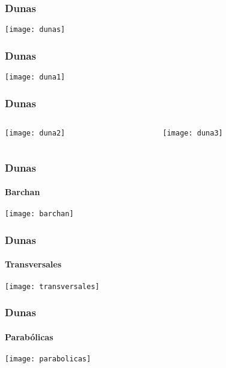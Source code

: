 \documentclass{beamer}
\begin{document}
\begin{frame}
\frametitle{Dunas}
\begin{center}
\texttt{[image: dunas]}
\end{center}
\end{frame}
\begin{frame}
\frametitle{Dunas}
\begin{center}
\texttt{[image: duna1]}
\end{center}
\end{frame}
\begin{frame}
\frametitle{Dunas}
\begin{columns}
\begin{column}{0.5\linewidth}
\begin{center}
\texttt{[image: duna2]}
\end{center}
\end{column}
\begin{column}{0.5\linewidth}
\begin{center}
\texttt{[image: duna3]}
\end{center}
\end{column}
\end{columns}
\end{frame}
\begin{frame}
\frametitle{Dunas}
\framesubtitle{Barchan}
\begin{center}
\texttt{[image: barchan]}
\end{center}
\end{frame}
\begin{frame}
\frametitle{Dunas}
\framesubtitle{Transversales}
\texttt{[image: transversales]}
\end{frame}
\begin{frame}
\frametitle{Dunas}
\framesubtitle{Parabólicas}
\begin{center}
\texttt{[image: parabolicas]}
\end{center}
\end{frame}
\end{document}

